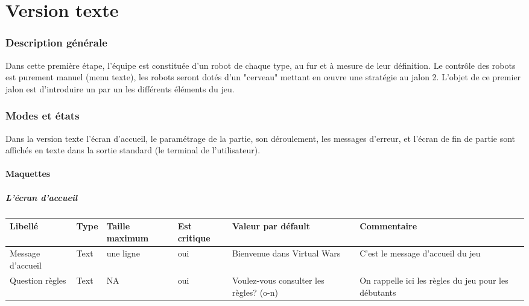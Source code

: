 \documentclass[12pt,a4paper]{article}
\begin{document}
\newpage				
\part{Version texte}
	\section{Description générale}
		Dans cette première étape, l'équipe est constituée d'un robot de chaque type, au fur et à mesure de leur
définition. Le contrôle des robots est purement manuel (menu texte), les robots seront dotés d'un "cerveau" mettant
en œuvre une stratégie au jalon 2. L'objet de ce premier jalon est d'introduire un par un les différents éléments du jeu.

		\section{Modes et états}
		Dans la version texte l'écran d'accueil, le paramétrage de la partie, son déroulement, les messages d'erreur, et l'écran de fin de partie sont affichés en texte dans la sortie standard (le terminal de l'utilisateur).
		\subsection{Maquettes}
			\subsubsection{L'écran d'accueil}
					\hspace{-3cm}
					\begin{tabular}{|p{2.5cm}|p{1.5cm}|p{3cm}|p{2.5cm}|p{3cm}|p{3.5cm}|} %
						\hline
							Libellé & Type & Taille maximum & Est critique & Valeur par défault & Commentaire \\
						\hline \hline
							Message d'accueil & Text & une ligne & oui & Bienvenue dans Virtual Wars & C'est le message d'accueil du jeu \\
							\hline
							Question règles & Text & NA & oui & Voulez-vous consulter les règles? (o-n)& On rappelle ici les règles du jeu pour les débutants \\
							\hline
					\end{tabular}
					\label{Information présente sur l'écran d'accueil}
				
\end{document}
